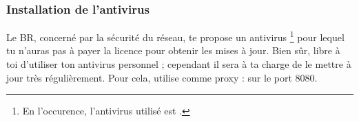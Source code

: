








\subsubsection{Installation de l'antivirus}
\label{antivirus} Le BR, concern\'e par la s\'ecurit\'e du r\'eseau, te propose un antivirus \footnote{En
l'occurence, l'antivirus utilis\'e est .} pour lequel tu n'auras pas \`a
payer la licence pour obtenir les mises \`a jour. Bien s\^{u}r, libre \`a toi d'utiliser ton antivirus
personnel ; cependant il sera \`a ta charge de le mettre \`a jour tr\`es r\'eguli\`erement. Pour cela,
utilise comme proxy :  sur le port 8080.

